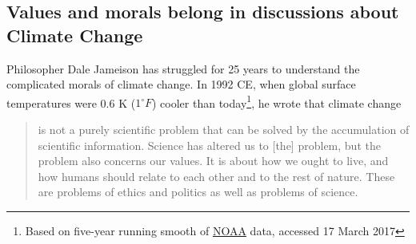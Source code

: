 \documentclass[amstex,12pt]{book}
\begin{document}
\subsection{Values and morals belong in discussions about Climate Change}\label{values_morals}
Philosopher Dale Jameison has struggled for 25 years to understand the complicated morals of climate change. In 1992 CE, when global surface temperatures were 0.6 K ($1^\circ F$) cooler than today\footnote{Based on five-year running smooth of \href{https://www.ncdc.noaa.gov/cag/time-series/global/globe/land_ocean/ytd/12/1880-2016.csv}{NOAA} data, accessed 17 March 2017}, he wrote that climate change 
\begin{quotation}
is not a purely scientific problem that can be solved by the accumulation of scientific information. Science has altered us to [the] problem, but the problem also concerns our values. It is about how we ought to live, and how humans should relate to each other and to the rest of nature. These are problems of ethics and politics as well as problems of science.
\end{quotation}
\end{document}
